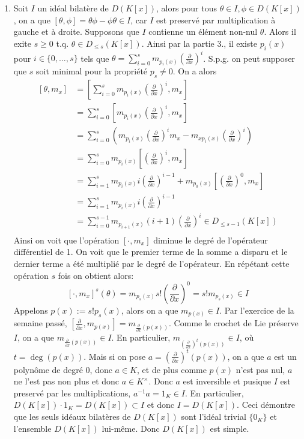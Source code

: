 \documentclass[french]{article}
\newcommand{\dx}{\frac{\partial}{\partial x}}
\newcommand{\mdx}[1]{\left(\frac{\partial}{\partial x}\right)^{#1}}
\newcommand{\DK}[1]{D_{\leq #1} (K[x])}
\newcommand{\lie}[2]{\left[#1, #2\right]}
\begin{document}
\begin{enumerate}
	\item
		Soit $I$ un idéal bilatère de $D(K[x])$, alors pour tous
		$\theta \in I, \phi \in D(K[x])$, on a que
		$\lie{\theta}{\phi} = \theta\phi - \phi\theta \in I$,
		car $I$ est preservé par multiplication à gauche et à droite.
		Supposons que $I$ contienne un élément non-nul $\theta$.
		Alors il exite $s \geq 0$ t.q. $\theta \in \DK{s}$.
		Ainsi par la partie 3., il existe $p_i(x)$ pour $i\in \{0, \dots, s\}$
		tels que $\theta = \sum_{i=0}^sm_{p_i(x)}\mdx{i}$.
		S.p.g. on peut supposer que $s$ soit minimal pour la propriété
		$p_s \neq 0$.
		On a alors
		\begin{align*}
			\lie{\theta}{m_x} &= \lie{\sum_{i=0}^sm_{p_i(x)}\mdx{i}}{m_x}\\
			&= \sum_{i=0}^s\lie{m_{p_i(x)}\mdx{i}}{m_x}\\
			&= \sum_{i=0}^s\left(m_{p_i(x)}\mdx{i}m_x - m_{xp_i(x)}\mdx{i}\right)\\
			&= \sum_{i=0}^sm_{p_i(x)}\lie{\mdx{i}}{m_x}\\
			&= \sum_{i=1}^sm_{p_i(x)}i\mdx{i-1}
			+ m_{p_0(x)}\lie{\mdx{0}}{m_x}\\
			&= \sum_{i=1}^sm_{p_i(x)}i\mdx{i-1}\\
			&= \sum_{i=0}^{s-1}m_{p_{i+1}(x)}(i+1)\mdx{i} \in \DK{s-1}\\
		\end{align*}
		Ainsi on voit que l'opération $\lie{\cdot}{m_x}$ diminue le degré de
		l'opérateur différentiel de 1. On voit que le premier terme de la somme a
		disparu et le dernier terme a été multiplié par le degré de l'opérateur.
		En répétant cette opération $s$ fois on
		obtient alors:
		\begin{equation*}
			\lie{\cdot}{m_x}^{s}(\theta) = m_{p_s(x)}s!\mdx{0} = s!m_{p_s(x)} \in I
		\end{equation*}
		Appelons $p(x) := s!p_s(x)$, alors on a que $m_{p(x)} \in I$.
		Par l'exercice de la semaine passé, 
		$\lie{\dx}{m_{p(x)}} = m_{\dx(p(x))}$. Comme le crochet de Lie préserve
		$I$, on a que $m_{\dx(p(x))} \in I$.
		En particulier, $m_{\mdx{t}(p(x))}\in I$, où $t = \deg(p(x))$.
		Mais si on pose $a = \mdx{t}(p(x))$, on a que $a$ est un polynôme de degré
		$0$, donc $a \in K$, et de plus comme $p(x)$ n'est pas nul, $a$ ne l'est
		pas non plus et donc $a \in K^\times$. Donc $a$ est inversible et pusique
		$I$ est preservé par les multiplications, $a^{-1}a =  1_K \in I$.
		En particulier, $D(K[x])\cdot 1_K = D(K[x]) \subset I$ et donc
		$I = D(K[x])$. Ceci démontre que les seuls idéaux bilatères de
		$D(K[x])$ sont l'idéal trivial $\{0_K\}$ et l'ensemble $D(K[x])$ lui-même.
		Donc $D(K[x])$ est simple.

\end{enumerate}
\end{document}
